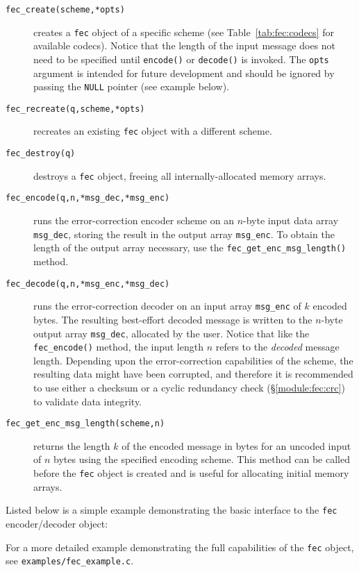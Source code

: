 \begin{description}
\item[{\tt fec\_create(scheme,*opts)}]
    creates a {\tt fec} object of a specific scheme
    (see Table~\ref{tab:fec:codecs} for available codecs).
    Notice that the length of the input message does not need to be
    specified until {\tt encode()} or {\tt decode()} is invoked.
    The {\tt opts} argument is intended for future development and
    should be ignored by passing the {\tt NULL} pointer
    (see example below).
\item[{\tt fec\_recreate(q,scheme,*opts)}]
    recreates an existing {\tt fec} object with a different scheme.
\item[{\tt fec\_destroy(q)}]
    destroys a {\tt fec} object, freeing all internally-allocated memory
    arrays.
\item[{\tt fec\_encode(q,n,*msg\_dec,*msg\_enc)}]
    runs the error-correction encoder scheme on an $n$-byte input data
    array {\tt msg\_dec}, storing the result in the output array
    {\tt msg\_enc}.
    To obtain the length of the output array necessary, use the
    {\tt fec\_get\_enc\_msg\_length()} method.
\item[{\tt fec\_decode(q,n,*msg\_enc,*msg\_dec)}]
    runs the error-correction decoder on an input array
    {\tt msg\_enc} of $k$ encoded bytes.
    The resulting best-effort decoded message is written to the $n$-byte
    output array {\tt msg\_dec}, allocated by the user.
    Notice that like the {\tt fec\_encode()} method, the input length
    $n$ refers to the {\em decoded} message length.
    Depending upon the error-correction capabilities of the scheme, the
    resulting data might have been corrupted,
    and therefore it is recommended to use either a checksum or a
    cyclic redundancy check (\S\ref{module:fec:crc})
    to validate data integrity.
\item[{\tt fec\_get\_enc\_msg\_length(scheme,n)}]
    returns the length $k$ of the encoded message in bytes
    for an uncoded input of $n$ bytes using the specified encoding
    scheme.
    This method can be called before the {\tt fec} object is created and
    is useful for allocating initial memory arrays.
\end{description}
%
Listed below is a simple example demonstrating the basic interface to
the {\tt fec} encoder/decoder object:
%

%
For a more detailed example demonstrating the full capabilities of the
{\tt fec} object, see {\tt examples/fec\_example.c}.
%

